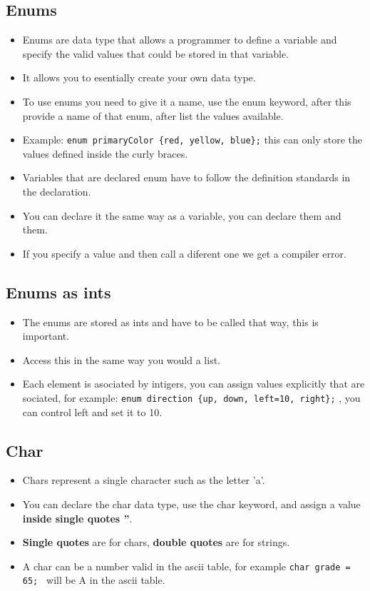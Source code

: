 \subsection{Enums}
\begin{itemize}
    \item Enums are data type that allows a programmer to define a variable and specify the valid values that could be stored in that variable.
    \item It allows you to esentially create your own data type.
    \item To use enums you need to give it a name, use the enum keyword, after this provide a name of that enum, after list the values available.
    \item Example: \verb|enum primaryColor {red, yellow, blue};| this can only store the values defined inside the curly braces. 
    \item Variables that are declared enum have to follow the definition standards in the declaration.
    \item You can declare it the same way as a variable, you can declare them and them.
    \item If you specify a value and then call a diferent one we get a compiler error.
\end{itemize}
\subsection{Enums as ints}
\begin{itemize}
    \item The enums are stored as ints and have to be called that way, this is important.
    \item Access this in the same way you would a list.
    \item Each element is asociated by intigers, you can assign values explicitly that are sociated, for example: \verb|enum direction {up, down, left=10, right};| , you can control left and set it to 10.
\end{itemize}
\subsection{Char}
\begin{itemize}
    \item Chars represent a single character such as the letter 'a'.
    \item You can declare the char data type, use the char keyword, and assign a value \textbf{inside single quotes ''}.
    \item \textbf{Single quotes} are for chars, \textbf{double quotes} are for strings.
    \item A char can be a number valid in the ascii table, for example \verb|char grade = 65; | will be A in the ascii table.
\end{itemize}
